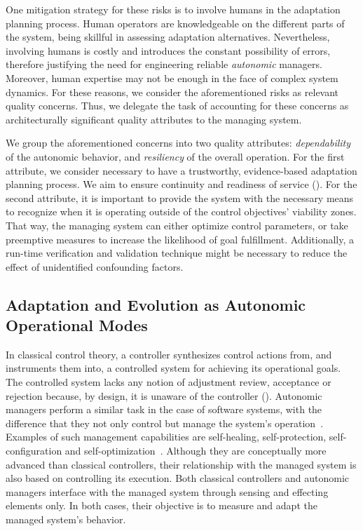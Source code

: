 One mitigation strategy for these risks is to involve humans in the adaptation planning process. Human operators are knowledgeable on the different parts of the system, being skillful in assessing adaptation alternatives. Nevertheless, involving humans is costly and introduces the constant possibility of errors, therefore justifying the need for engineering reliable \emph{autonomic} managers. Moreover, human expertise may not be enough in the face of complex system dynamics. For these reasons, we consider the aforementioned risks as relevant quality concerns. Thus, we delegate the task of accounting for these concerns as architecturally significant quality attributes to the managing system.

We group the aforementioned concerns into two quality attributes: \emph{dependability} of the autonomic behavior, and \emph{resiliency} of the overall operation. For the first attribute, we consider necessary to have a trustworthy, evidence-based adaptation planning process. We aim to ensure continuity and readiness of service (). For the second attribute, it is important to provide the system with the necessary means to recognize when it is operating outside of the control objectives' viability zones. That way, the managing system can either optimize control parameters, or take preemptive measures to increase the likelihood of goal fulfillment. Additionally, a run-time verification and validation technique might be necessary to reduce the effect of unidentified confounding factors.

\subsection{Adaptation and Evolution as Autonomic Operational Modes}
\label{subsect:reference-architecture--adaptation-and-evolution-as-operational-modes}

In classical control theory, a controller synthesizes control actions from, and instruments them into, a controlled system for achieving its operational goals. The controlled system lacks any notion of adjustment review, acceptance or rejection because, by design, it is unaware of the controller (). Autonomic managers perform a similar task in the case of software systems, with the difference that they not only control but manage the system's operation~\cite{diao-2005-control}. Examples of such management capabilities are self-healing, self-protection, self-configuration and self-optimization~\cite{kephart-2003-vision}. Although they are conceptually more advanced than classical controllers, their relationship with the managed system is also based on controlling its execution. Both classical controllers and autonomic managers interface with the managed system through sensing and effecting elements only. %
In both cases, their objective is to measure and adapt the managed system's behavior.

